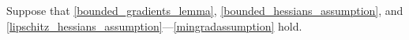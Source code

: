 Suppose that \cref{bounded_gradients_lemma}, \cref{bounded_hessians_assumption}, and \cref{lipschitz_hessians_assumption}---\cref{mingradassumption} hold.
